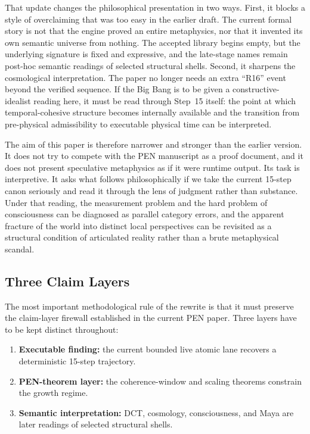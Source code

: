 \documentclass[11pt,a4paper]{article}
\theoremstyle{plain}
\theoremstyle{definition}
\theoremstyle{remark}
\begin{document}
That update changes the philosophical presentation in two ways.
First, it blocks a style of overclaiming that was too easy in the earlier draft.
The current formal story is not that the engine proved an entire metaphysics, nor that it invented its own semantic universe from nothing.
The accepted library begins empty, but the underlying signature is fixed and expressive, and the late-stage names remain post-hoc semantic readings of selected structural shells.
Second, it sharpens the cosmological interpretation.
The paper no longer needs an extra ``R16'' event beyond the verified sequence.
If the Big Bang is to be given a constructive-idealist reading here, it must be read through Step~15 itself: the point at which temporal-cohesive structure becomes internally available and the transition from pre-physical admissibility to executable physical time can be interpreted.

The aim of this paper is therefore narrower and stronger than the earlier version.
It does not try to compete with the PEN manuscript as a proof document, and it does not present speculative metaphysics as if it were runtime output.
Its task is interpretive.
It asks what follows philosophically if we take the current 15-step canon seriously and read it through the lens of judgment rather than substance.
Under that reading, the measurement problem and the hard problem of consciousness can be diagnosed as parallel category errors, and the apparent fracture of the world into distinct local perspectives can be revisited as a structural condition of articulated reality rather than a brute metaphysical scandal.

\subsection{Three Claim Layers}
\label{subsec:claim-layers}

The most important methodological rule of the rewrite is that it must preserve the claim-layer firewall established in the current PEN paper.
Three layers have to be kept distinct throughout:
\begin{enumerate}[nosep]
    \item \textbf{Executable finding:} the current bounded live atomic lane recovers a deterministic 15-step trajectory.
    \item \textbf{PEN-theorem layer:} the coherence-window and scaling theorems constrain the growth regime.
    \item \textbf{Semantic interpretation:} DCT, cosmology, consciousness, and Maya are later readings of selected structural shells.
\end{enumerate}
\end{document}
